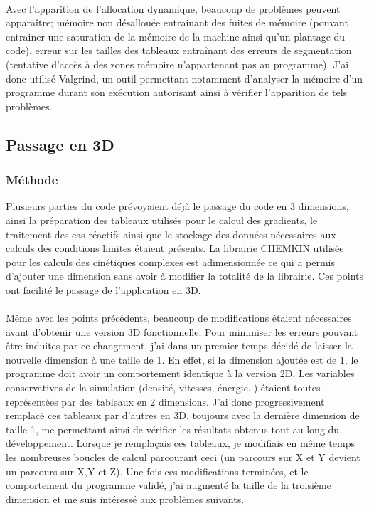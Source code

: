 \paragraph{}Avec l'apparition de l'allocation dynamique, beaucoup de problèmes peuvent apparaître; mémoire non désallouée entrainant des fuites de mémoire (pouvant entrainer une saturation de la mémoire de la machine ainsi qu'un plantage du code), erreur sur les tailles des tableaux entraînant des erreurs de segmentation (tentative d'accès à des zones mémoire n'appartenant pas au programme).
J'ai donc utilisé Valgrind, un outil permettant notamment d'analyser la mémoire d'un programme durant son exécution autorisant ainsi à vérifier l'apparition de tels problèmes.




\subsection{Passage en 3D}

\subsubsection{Méthode}\label{sec:3dmeth}
Plusieurs parties du code prévoyaient déjà le passage du code en 3 dimensions, ainsi la préparation des tableaux utilisés pour le calcul des gradients, le traitement des cas réactifs ainsi que le stockage des données nécessaires aux calculs des conditions limites étaient présents. La librairie CHEMKIN utilisée pour les calculs des cinétiques complexes est adimensionnée ce qui a permis d'ajouter une dimension sans avoir à modifier la totalité de la librairie. Ces points ont facilité le passage de l'application en 3D.


\paragraph{}Même avec les points précédents, beaucoup de modifications étaient nécessaires avant d'obtenir une version 3D fonctionnelle. Pour minimiser les erreurs pouvant être induites par ce changement, j'ai dans un premier temps décidé de laisser la nouvelle dimension à une taille de 1. En effet, si la dimension ajoutée est de 1, le programme doit avoir un comportement identique à la version 2D. Les variables conservatives de la simulation (densité, vitesses, énergie..) étaient toutes représentées par des tableaux en 2 dimensions. J'ai donc progressivement remplacé ces tableaux par d'autres en 3D, toujours avec la dernière dimension de taille 1,  me permettant ainsi de vérifier les résultats obtenus tout au long du développement. Lorsque je remplaçais ces tableaux, je modifiais en même temps les nombreuses boucles de calcul parcourant ceci (un parcours sur X et Y devient un parcours sur X,Y et Z). Une fois ces modifications terminées, et le comportement du programme validé, j'ai augmenté la taille de la troisième dimension et me suis intéressé aux problèmes suivants.



